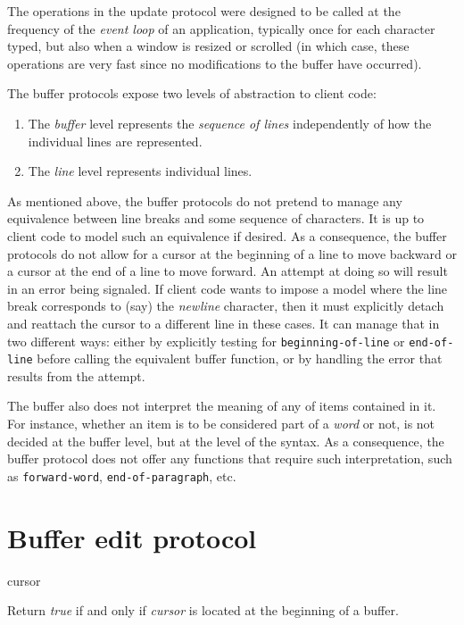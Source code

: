 The operations in the update protocol were designed to be called at
the frequency of the \emph{event loop} of an application, typically
once for each character typed, but also when a window is resized or
scrolled (in which case, these operations are very fast since no
modifications to the buffer have occurred). 

The buffer protocols expose two levels of abstraction to client code: 

\begin{enumerate}
\item The \emph{buffer} level represents the \emph{sequence of lines}
  independently of how the individual lines are represented.  
\item The \emph{line} level represents individual lines. 
\end{enumerate}

As mentioned above, the buffer protocols do not pretend to manage any
equivalence between line breaks and some sequence of characters.  It
is up to client code to model such an equivalence if desired.  As a
consequence, the buffer protocols do not allow for a cursor at the
beginning of a line to move backward or a cursor at the end of a line
to move forward.  An attempt at doing so will result in an error being
signaled.  If client code wants to impose a model where the line break
corresponds to (say) the \emph{newline} character, then it must
explicitly detach and reattach the cursor to a different line in these
cases.  It can manage that in two different ways: either by explicitly
testing for \texttt{beginning-of-line} or \texttt{end-of-line} before
calling the equivalent buffer function, or by handling the error that
results from the attempt.

The buffer also does not interpret the meaning of any of items
contained in it.  For instance, whether an item is to be considered
part of a \emph{word} or not, is not decided at the buffer level, but
at the level of the syntax.  As a consequence, the buffer protocol
does not offer any functions that require such interpretation, such as
\texttt{forward-word}, \texttt{end-of-paragraph}, etc. 

\section{Buffer edit protocol}

 {cursor}

Return \textit{true} if and only if \textit{cursor} is located at the
beginning of a buffer.

